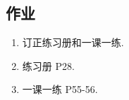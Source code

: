\begin{CJK}{UTF8}{gkai}
\section{作业}
\begin{enumerate}
\item 订正练习册和一课一练.
\item 练习册 P28.
\item 一课一练 P55-56.
\end{enumerate}

\end{CJK}
